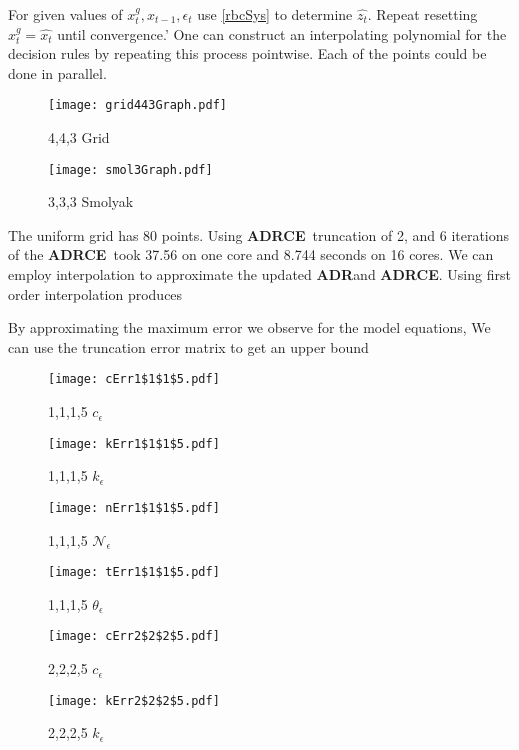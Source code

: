 \documentclass[12pt]{article}
\newcommand{\ADRCE}{{\bf ADRCE}}
\newcommand{\ADR}{{\bf ADR}}
\begin{document}
For given values of $x_t^g, x_{t-1}, \epsilon_t $ use \ref{rbcSys} to determine $\hat{z_t}$.  Repeat resetting  $x_t^g=\hat{x_t}$ until convergence.'
One can construct an interpolating polynomial for the decision rules by repeating this process pointwise.  Each of the points could be done in parallel.

\begin{figure}
  \centering
\texttt{[image: grid443Graph.pdf]}  
  \caption{4,4,3 Grid}
  \label{fig:443}
\end{figure}

\begin{figure}
  \centering
\texttt{[image: smol3Graph.pdf]}  
  \caption{3,3,3 Smolyak}
  \label{fig:333}
\end{figure}


The uniform grid has 80 points.
Using  \ADRCE\ truncation of 2, and 6 iterations of the \ADRCE\ took
37.56 on one core and 8.744 seconds on 16 cores.
We can employ interpolation to approximate the updated \ADR and \ADRCE.  
Using first order interpolation produces 

By approximating the maximum error we observe for the model equations,
We can use the truncation error matrix to get an upper bound


\begin{figure}
  \centering
\texttt{[image: cErr1\$1\$1\$5.pdf]}  
  \caption{1,1,1,5 $c_\epsilon$}
\end{figure}


\begin{figure}
  \centering
\texttt{[image: kErr1\$1\$1\$5.pdf]}  
  \caption{1,1,1,5 $k_\epsilon$}
\end{figure}


\begin{figure}
  \centering
\texttt{[image: nErr1\$1\$1\$5.pdf]}  
  \caption{1,1,1,5 $\mathcal{N}_\epsilon$}
\end{figure}


\begin{figure}
  \centering
\texttt{[image: tErr1\$1\$1\$5.pdf]}  
  \caption{1,1,1,5 $\theta_\epsilon$}
\end{figure}



\begin{figure}
  \centering
\texttt{[image: cErr2\$2\$2\$5.pdf]}  
  \caption{2,2,2,5 $c_\epsilon$}
\end{figure}


\begin{figure}
  \centering
\texttt{[image: kErr2\$2\$2\$5.pdf]}  
  \caption{2,2,2,5 $k_\epsilon$}
\end{figure}
\end{document}
